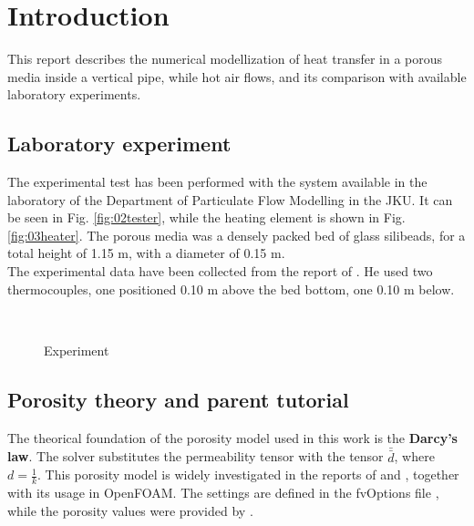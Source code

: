 
\section{Introduction}
\label{section:introduction}

This report describes the numerical modellization of heat transfer in a porous
media inside a vertical pipe, while hot air flows, and its comparison with available laboratory
experiments.

\subsection{Laboratory experiment}
\label{subsection:laboratoryexperiment}

The experimental test has been performed with the system available in the
laboratory of the Department of Particulate Flow Modelling in the JKU.
It can be seen in Fig. \ref{fig:02tester}, while the heating element is shown in
Fig. \ref{fig:03heater}. 
The porous media was a densely packed bed of glass silibeads, for a total height
of 1.15 m, with a diameter of 0.15 m. \\
The experimental data have been collected from the report of
\textcite{ReportHofer}.
He used two thermocouples, one positioned 0.10 m above the bed bottom, one 0.10
m below.

\begin{figure}[!h]
\centering
{} \quad  %
{} \\  
\caption[Experiment]{Experiment}
\label{fig:experiments}
\end{figure}

\subsection{Porosity theory and parent tutorial}
\label{subsection:porositytheorytutorial}

The theorical foundation of the porosity model used in this work is the
\textbf{Darcy's law}.
The solver substitutes the permeability tensor with the tensor $\bar{\bar{d}}$,
where $d= \frac {1}{k}$.
This porosity model is widely investigated in the reports of
\textcite{ReportReveillon} and \textcite{Soulaine}, together with its usage in
OpenFOAM\textregistered.
The settings are defined in the fvOptions file \cite{OForgFv},
while the porosity values were provided by \textcite{Permeability}.


